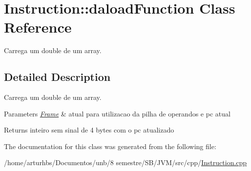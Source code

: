 \hypertarget{classInstruction_1_1daloadFunction}{}\section{Instruction\+:\+:daload\+Function Class Reference}
\label{classInstruction_1_1daloadFunction}


Carrega um double de um array.  




\subsection{Detailed Description}
Carrega um double de um array. 


\begin{DoxyParams}{Parameters}
{\em \hyperlink{classFrame}{Frame}} & atual para utilizacao da pilha de operandos e pc atual \\
\hline
\end{DoxyParams}
\begin{DoxyReturn}{Returns}
inteiro sem sinal de 4 bytes com o pc atualizado 
\end{DoxyReturn}


The documentation for this class was generated from the following file\+:\begin{DoxyCompactItemize}
\item 
/home/arturhbs/\+Documentos/unb/8 semestre/\+S\+B/\+J\+V\+M/src/cpp/\hyperlink{Instruction_8cpp}{Instruction.\+cpp}\end{DoxyCompactItemize}
